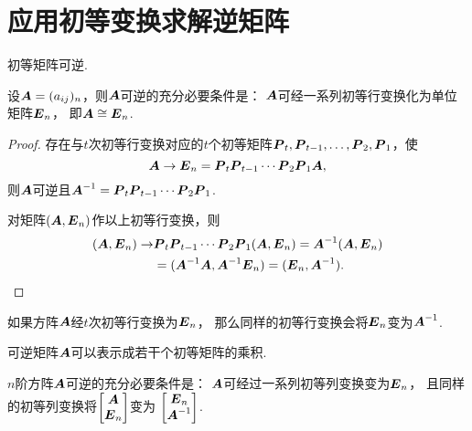 \section{应用初等变换求解逆矩阵}
\begin{property}\label{theorem:逆矩阵.初等矩阵的性质3}
初等矩阵可逆.
\end{property}

\begin{theorem}\label{theorem:逆矩阵.可逆矩阵与初等矩阵的关系}
设\(\boldsymbol{A}=(a_{ij})_n\)，则\(\boldsymbol{A}\)可逆的充分必要条件是：
\(\boldsymbol{A}\)可经一系列初等行变换化为单位矩阵\(\boldsymbol{E}_n\)，
即\(\boldsymbol{A} \cong \boldsymbol{E}_n\).
\begin{proof}
\def\Ps{\vb{P}_t \vb{P}_{t-1} \dotsm \vb{P}_2 \vb{P}_1}
存在与\(t\)次初等行变换对应的\(t\)个初等矩阵\(\boldsymbol{P}_t,\boldsymbol{P}_{t-1},\dotsc,\boldsymbol{P}_2,\boldsymbol{P}_1\)，使\begin{equation*}
	\vb{A} \to \vb{E}_n = \Ps \vb{A},
\end{equation*}
则\(\boldsymbol{A}\)可逆且\(\vb{A}^{-1} = \Ps\).

对矩阵\((\boldsymbol{A},\boldsymbol{E}_n)\)作以上初等行变换，则\begin{align*}
	(\vb{A},\vb{E}_n) \to &\Ps(\vb{A},\vb{E}_n) = \vb{A}^{-1}(\vb{A},\vb{E}_n) \\
	&= (\vb{A}^{-1}\vb{A},\vb{A}^{-1}\vb{E}_n) = (\vb{E}_n,\vb{A}^{-1}).
	\qedhere
\end{align*}
\end{proof}
\end{theorem}

\begin{corollary}\label{theorem:逆矩阵.计算逆矩阵的方法}
如果方阵\(\boldsymbol{A}\)经\(t\)次初等行变换为\(\boldsymbol{E}_n\)，
那么同样的初等行变换会将\(\boldsymbol{E}_n\)变为\(\boldsymbol{A}^{-1}\).
\end{corollary}

\begin{corollary}
可逆矩阵\(\boldsymbol{A}\)可以表示成若干个初等矩阵的乘积.
\end{corollary}

\begin{corollary}
\(n\)阶方阵\(\boldsymbol{A}\)可逆的充分必要条件是：
\(\boldsymbol{A}\)可经过一系列初等列变换变为\(\boldsymbol{E}_n\)，
且同样的初等列变换将\(\begin{bmatrix}\boldsymbol{A}\\\boldsymbol{E}_n\end{bmatrix}\)变为
\(\begin{bmatrix}\boldsymbol{E}_n\\\boldsymbol{A}^{-1}\end{bmatrix}\).
\end{corollary}

